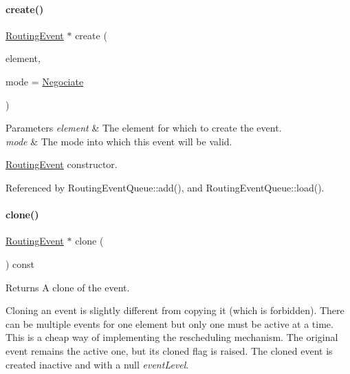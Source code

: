 \paragraph{\texorpdfstring{create()}{create()}}
{\footnotesize\ttfamily \mbox{\hyperlink{classKite_1_1RoutingEvent}{Routing\+Event}} $\ast$ create (\begin{DoxyParamCaption}\item[{\mbox{\hyperlink{classKite_1_1TrackElement}{Track\+Element}} $\ast$}]{element,  }\item[{unsigned int}]{mode = {\ttfamily \mbox{\hyperlink{classKite_1_1RoutingEvent_a46c8a310cf4c094f8c80e1cb8dc1f911a3980b02882c46c9bd4caf15040b85d1a}{Negociate}}} }\end{DoxyParamCaption})\hspace{0.3cm}{\ttfamily [static]}}


\begin{DoxyParams}{Parameters}
{\em element} & The element for which to create the event. \\
\hline
{\em mode} & The mode into which this event will be valid.\\
\hline
\end{DoxyParams}
\mbox{\hyperlink{classKite_1_1RoutingEvent}{Routing\+Event}} constructor. 

Referenced by Routing\+Event\+Queue\+::add(), and Routing\+Event\+Queue\+::load().

\mbox{\label{classKite_1_1RoutingEvent_ad4469c7fdb58a5f0bda8755302e37021}} 
\paragraph{\texorpdfstring{clone()}{clone()}}
{\footnotesize\ttfamily \mbox{\hyperlink{classKite_1_1RoutingEvent}{Routing\+Event}} $\ast$ clone (\begin{DoxyParamCaption}{ }\end{DoxyParamCaption}) const}

\begin{DoxyReturn}{Returns}
A clone of the event.
\end{DoxyReturn}
Cloning an event is slightly different from copying it (which is forbidden). There can be multiple events for one {\ttfamily element} but only one must be active at a time. This is a cheap way of implementing the rescheduling mechanism. The original event remains the active one, but it\textquotesingle{}s cloned flag is raised. The cloned event is created inactive and with a null {\itshape event\+Level}. 

